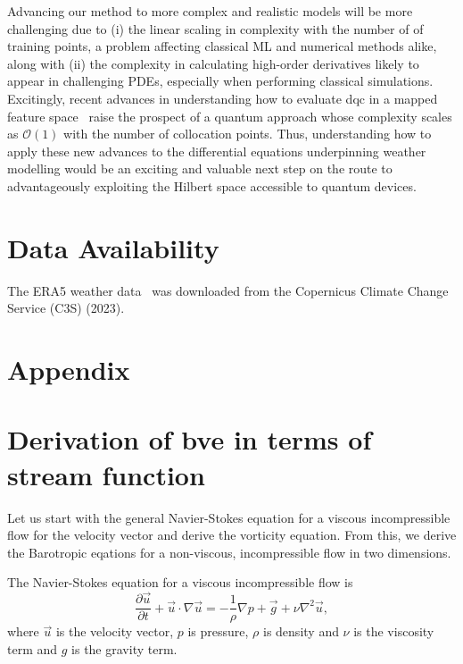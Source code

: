 \documentclass[aps,pra,a4paper,twocolumn,longbibliography,groupedaddress]{revtex4-2}
\begin{document}
Advancing our method to more complex and realistic models
will be more challenging due to 
(i) the linear scaling in complexity with the number of of training points, a problem affecting classical ML and numerical methods alike, 
along with (ii) the complexity in calculating high-order derivatives likely to appear in challenging PDEs, especially when performing classical simulations. 
Excitingly, recent advances in understanding how to evaluate \gls{dqc} in a mapped feature space~\cite{paine2023physics} raise the prospect of a quantum approach whose complexity scales as $\mathcal{O}(1)$ with the number of collocation points. Thus, understanding how to apply these new advances to the differential equations underpinning weather modelling would be an exciting and valuable next step on the route to advantageously exploiting the Hilbert space accessible to quantum devices.

\section*{Data Availability}
The ERA5 weather data~\cite{hersbach2018era5} was downloaded from the Copernicus Climate Change Service (C3S) (2023).






\appendix
\newpage

\section*{Appendix}

\section{Derivation of \gls{bve} in terms of stream function}\label{app:bve_derivation}

Let us start with the general Navier-Stokes equation for a viscous incompressible flow for the velocity vector and derive the vorticity equation. From this, we derive the Barotropic eqations for a non-viscous, incompressible flow in two dimensions. 

The Navier-Stokes equation for a viscous incompressible flow is
\begin{equation}
    \frac{\partial \vec{u}}{\partial t} + \vec{u} \cdot \nabla \vec{u} = - \frac{1}{\rho}\nabla p + \vec{g} + \nu \nabla^2\vec{u},
\end{equation}
where $\vec{u}$ is the velocity vector, $p$ is pressure, $\rho$ is density and $\nu$ is the viscosity term and $g$ is the gravity term. 
\end{document}

